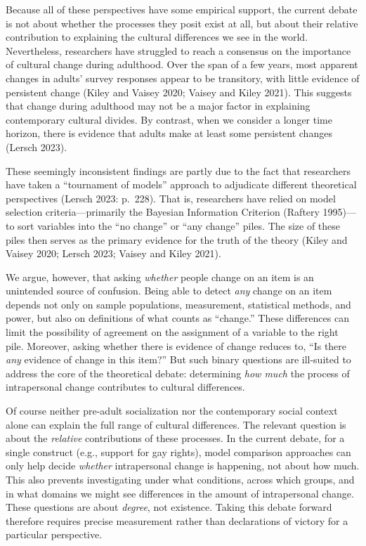 \documentclass[
  12pt,
]{article}
\begin{document}
Because all of these perspectives have some empirical support, the
current debate is not about whether the processes they posit exist at
all, but about their relative contribution to explaining the cultural
differences we see in the world. Nevertheless, researchers have
struggled to reach a consensus on the importance of cultural change
during adulthood. Over the span of a few years, most apparent changes in
adults' survey responses appear to be transitory, with little evidence
of persistent change (Kiley and Vaisey 2020; Vaisey and Kiley 2021).
This suggests that change during adulthood may not be a major factor in
explaining contemporary cultural divides. By contrast, when we consider
a longer time horizon, there is evidence that adults make at least some
persistent changes (Lersch 2023).

These seemingly inconsistent findings are partly due to the fact that
researchers have taken a ``tournament of models'' approach to adjudicate
different theoretical perspectives (Lersch 2023: p.~228). That is,
researchers have relied on model selection criteria---primarily the
Bayesian Information Criterion (Raftery 1995)---to sort variables into
the ``no change'' or ``any change'' piles. The size of these piles then
serves as the primary evidence for the truth of the theory (Kiley and
Vaisey 2020; Lersch 2023; Vaisey and Kiley 2021).

We argue, however, that asking \emph{whether} people change on an item
is an unintended source of confusion. Being able to detect \emph{any}
change on an item depends not only on sample populations, measurement,
statistical methods, and power, but also on definitions of what counts
as ``change.'' These differences can limit the possibility of agreement
on the assignment of a variable to the right pile. Moreover, asking
whether there is evidence of change reduces to, ``Is there \emph{any}
evidence of change in this item?'' But such binary questions are
ill-suited to address the core of the theoretical debate: determining
\emph{how much} the process of intrapersonal change contributes to
cultural differences.

Of course neither pre-adult socialization nor the contemporary social
context alone can explain the full range of cultural differences. The
relevant question is about the \emph{relative} contributions of these
processes. In the current debate, for a single construct (e.g., support
for gay rights), model comparison approaches can only help decide
\emph{whether} intrapersonal change is happening, not about how much.
This also prevents investigating under what conditions, across which
groups, and in what domains we might see differences in the amount of
intrapersonal change. These questions are about \emph{degree}, not
existence. Taking this debate forward therefore requires precise
measurement rather than declarations of victory for a particular
perspective.
\end{document}
